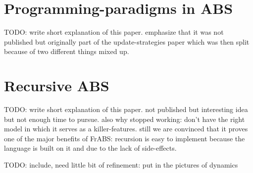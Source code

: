 \begin{appendices}


\chapter{Programming-paradigms in ABS}
TODO: write short explanation of this paper. emphasize that it was not published but originally part of the update-strategies paper which was then split because of two different things mixed up.



\chapter{Recursive ABS}
TODO: write short explanation of this paper. not published but interesting idea but not enough time to pursue. also why stopped working: don't have the right model in which it serves as a killer-features. still we are convinced that it proves one of the major benefits of FrABS: recursion is easy to implement because the language is built on it and due to the lack of side-effects.

TODO: include, need little bit of refinement: put in the pictures of dynamics

\end{appendices}